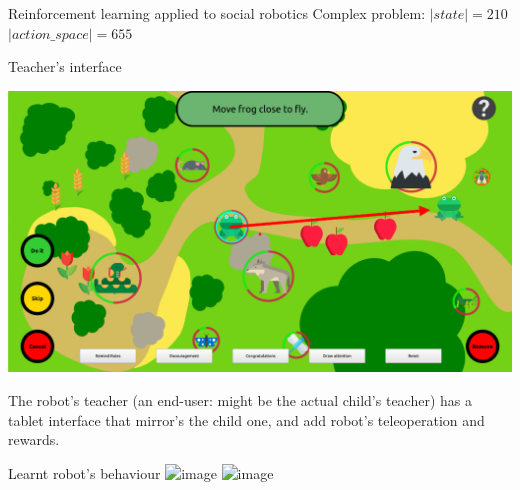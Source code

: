 \documentclass[xcolor=table]{beamer}
\begin{document}
{\begin{frame}{Reinforcement learning applied to social robotics}
    Complex problem: 
    $|state| = 210$ $| action\_space| = 655$

\end{frame}

\begin{frame}{Teacher's interface}
    \begin{center}
        \includegraphics[width=0.9\linewidth]{sparc/woz-gui}
    \end{center}

    The robot's teacher (an end-user: might be the actual child's teacher) has a
    tablet interface that mirror's the child one, and add robot's teleoperation
    and rewards.

\end{frame}




\begin{frame}{Learnt robot's behaviour}
    \includegraphics<1>[width=0.9\linewidth]{sparc/actions-supervised}
    \includegraphics<2>[width=0.9\linewidth]{sparc/actions}



\end{frame}
}
\end{document}

